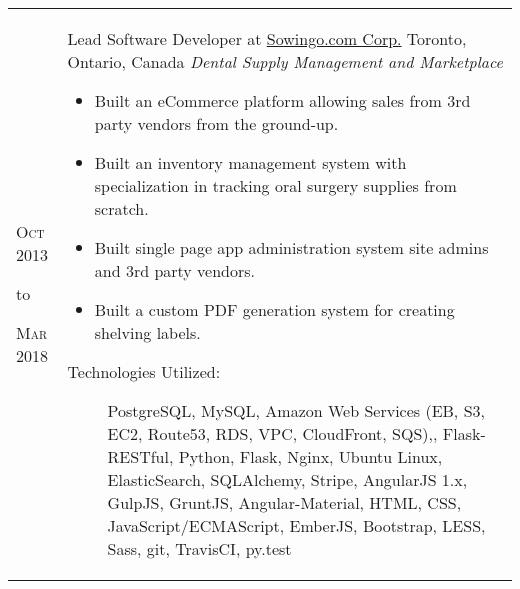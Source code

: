 \documentclass[a4paper,10pt]{article}
\begin{document}
        \\\begin{tabular}{ R{1.5cm} | p{10.5cm} }
            \hfill \textsc{Oct 2013}\newline \begin{center} to \end{center} \hfill \textsc{Mar 2018} &
            Lead Software Developer at \href{https://sowingo.com/}{Sowingo.com Corp.}\newline
            Toronto, Ontario, Canada\newline
            \emph{Dental Supply Management and Marketplace} \newline
            \fontsize{9pt}{10pt}\selectfont
            \begin{itemize}
                \item Built an eCommerce platform allowing sales from 3rd party vendors from the ground-up.
                \item Built an inventory management system with specialization in tracking oral surgery supplies from scratch.
                \item Built single page app administration system site admins and 3rd party vendors.
                \item Built a custom PDF generation system for creating shelving labels.
            \end{itemize}
            \bigskip
            \begin{description}
                \item[Technologies Utilized:]
                PostgreSQL, MySQL, Amazon Web Services (EB, S3, EC2, Route53, RDS, VPC, CloudFront, SQS),, Flask-RESTful, Python, Flask, Nginx, Ubuntu Linux, ElasticSearch, SQLAlchemy, Stripe, AngularJS 1.x, GulpJS, GruntJS, Angular-Material, HTML, CSS, JavaScript/ECMAScript, EmberJS, Bootstrap, LESS, Sass, git, TravisCI, py.test
            \end{description}
        \end{tabular}
\end{document}
